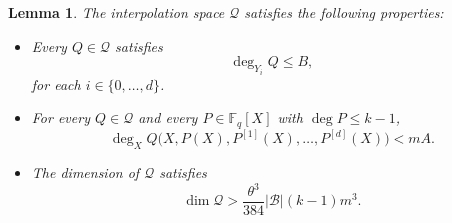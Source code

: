 \documentclass[10pt,a4paper]{amsart}
\newtheorem{lemma}{Lemma}
\begin{document}
\begin{lemma}\label{lem:global-budgets}
The interpolation space $\mathcal Q$ satisfies the following properties:
\begin{itemize}
    \item Every $Q\in\mathcal Q$ satisfies
    \[
    \deg_{Y_i}Q
    \le B,
    \]
    for each $i \in \{0,\ldots, d\}$.
    \item For every $Q\in\mathcal Q$ and every
    $P\in\mathbb F_q[X]$ with $\deg P\le k-1$,
    \[
    \deg_X
    Q\bigl(X,P(X),P^{[1]}(X),\ldots,P^{[d]}(X)\bigr)
    <mA.
    \]

    \item The dimension of $\mathcal Q$ satisfies
    \[
    \dim\mathcal Q
    >
    \frac{\theta^3}{384}
    |\mathcal B|(k-1)m^3.
    \]
\end{itemize}
\end{lemma}
\end{document}
